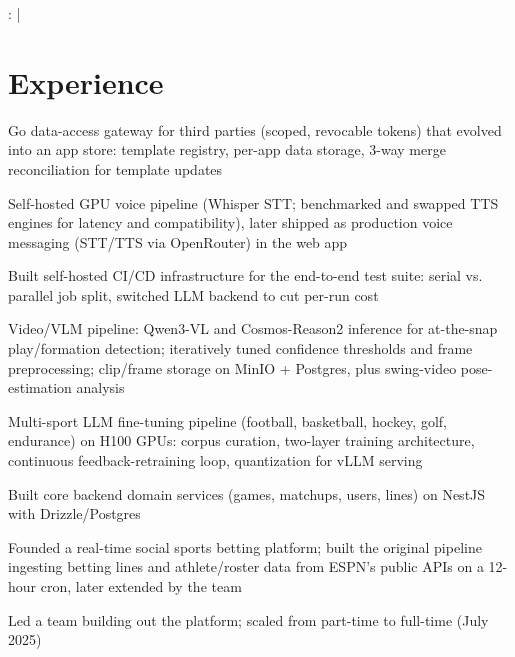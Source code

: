 \documentclass[print]{jack-resume}
\begin{document}
\raggedright{
    :
      \href{https://www.linkedin.com/in/jack-sturtevant/}{ \ExternalLink} |
     \href{https://github.com/jacksturt}{ \ExternalLink}}


\section{Experience}

\begin{tightemize}
    \item Go data-access gateway for third parties (scoped, revocable tokens) that evolved into an app store: template registry, per-app data storage, 3-way merge reconciliation for template updates
    \item Self-hosted GPU voice pipeline (Whisper STT; benchmarked and swapped TTS engines for latency and compatibility), later shipped as production voice messaging (STT/TTS via OpenRouter) in the web app
    \item Built self-hosted CI/CD infrastructure for the end-to-end test suite: serial vs. parallel job split, switched LLM backend to cut per-run cost
    \item Video/VLM pipeline: Qwen3-VL and Cosmos-Reason2 inference for at-the-snap play/formation detection; iteratively tuned confidence thresholds and frame preprocessing; clip/frame storage on MinIO + Postgres, plus swing-video pose-estimation analysis
    \item Multi-sport LLM fine-tuning pipeline (football, basketball, hockey, golf, endurance) on H100 GPUs: corpus curation, two-layer training architecture, continuous feedback-retraining loop, quantization for vLLM serving
\end{tightemize}
\sectionsep

\begin{tightemize}
    \item Built core backend domain services (games, matchups, users, lines) on NestJS with Drizzle/Postgres
    \item Founded a real-time social sports betting platform; built the original pipeline ingesting betting lines and athlete/roster data from ESPN's public APIs on a 12-hour cron, later extended by the team
    \item Led a team building out the platform; scaled from part-time to full-time (July 2025)
\end{tightemize}
\sectionsep
\end{document}
